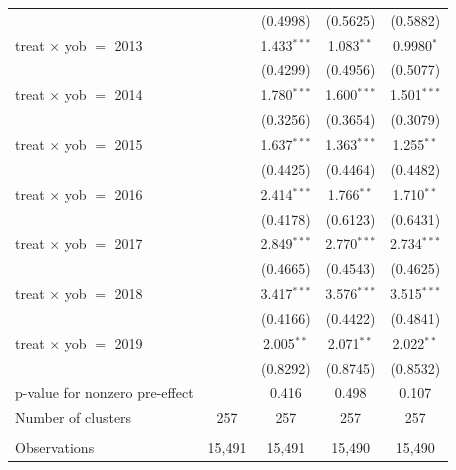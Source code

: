 \begin{table}[htbp]
\begin{tabular}{lcccc}
                                     &               & (0.4998)      & (0.5625)      & (0.5882)\\   
      treat $\times$ yob $=$ 2013    &               & 1.433$^{***}$ & 1.083$^{**}$  & 0.9980$^{*}$\\   
                                     &               & (0.4299)      & (0.4956)      & (0.5077)\\   
      treat $\times$ yob $=$ 2014    &               & 1.780$^{***}$ & 1.600$^{***}$ & 1.501$^{***}$\\   
                                     &               & (0.3256)      & (0.3654)      & (0.3079)\\   
      treat $\times$ yob $=$ 2015    &               & 1.637$^{***}$ & 1.363$^{***}$ & 1.255$^{**}$\\   
                                     &               & (0.4425)      & (0.4464)      & (0.4482)\\   
      treat $\times$ yob $=$ 2016    &               & 2.414$^{***}$ & 1.766$^{**}$  & 1.710$^{**}$\\   
                                     &               & (0.4178)      & (0.6123)      & (0.6431)\\   
      treat $\times$ yob $=$ 2017    &               & 2.849$^{***}$ & 2.770$^{***}$ & 2.734$^{***}$\\   
                                     &               & (0.4665)      & (0.4543)      & (0.4625)\\   
      treat $\times$ yob $=$ 2018    &               & 3.417$^{***}$ & 3.576$^{***}$ & 3.515$^{***}$\\   
                                     &               & (0.4166)      & (0.4422)      & (0.4841)\\   
      treat $\times$ yob $=$ 2019    &               & 2.005$^{**}$  & 2.071$^{**}$  & 2.022$^{**}$\\   
                                     &               & (0.8292)      & (0.8745)      & (0.8532)\\   
      p-value for nonzero pre-effect &               & 0.416         & 0.498         & 0.107\\  
      Number of clusters             & 257            & 257            & 257            & 257\\  
       \\
      Observations                   & 15,491        & 15,491        & 15,490        & 15,490\\  

\end{tabular}
\end{table}
